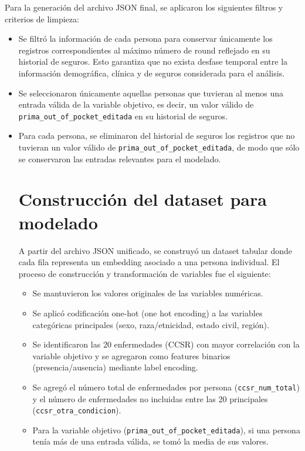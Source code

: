 \documentclass[12pt,a4paper]{article}
\begin{document}
Para la generación del archivo JSON final, se aplicaron los siguientes filtros y criterios de limpieza:
\begin{itemize}
    \item Se filtró la información de cada persona para conservar únicamente los registros correspondientes al máximo número de round reflejado en su historial de seguros. Esto garantiza que no exista desfase temporal entre la información demográfica, clínica y de seguros considerada para el análisis.
    \item Se seleccionaron únicamente aquellas personas que tuvieran al menos una entrada válida de la variable objetivo, es decir, un valor válido de \texttt{prima\_out\_of\_pocket\_editada} en su historial de seguros.
    \item Para cada persona, se eliminaron del historial de seguros los registros que no tuvieran un valor válido de \texttt{prima\_out\_of\_pocket\_editada}, de modo que sólo se conservaron las entradas relevantes para el modelado.



\section*{Construcción del dataset para modelado}

A partir del archivo JSON unificado, se construyó un dataset tabular donde cada fila representa un embedding asociado a una persona individual. El proceso de construcción y transformación de variables fue el siguiente:
\begin{itemize}
    \item Se mantuvieron los valores originales de las variables numéricas.
    \item Se aplicó codificación one-hot (one hot encoding) a las variables categóricas principales (sexo, raza/etnicidad, estado civil, región).
    \item Se identificaron las 20 enfermedades (CCSR) con mayor correlación con la variable objetivo y se agregaron como features binarios (presencia/ausencia) mediante label encoding.
    \item Se agregó el número total de enfermedades por persona (\texttt{ccsr\_num\_total}) y el número de enfermedades no incluidas entre las 20 principales (\texttt{ccsr\_otra\_condicion}).
    \item Para la variable objetivo (\texttt{prima\_out\_of\_pocket\_editada}), si una persona tenía más de una entrada válida, se tomó la media de sus valores.
\end{itemize}


\end{itemize}
\end{document}
